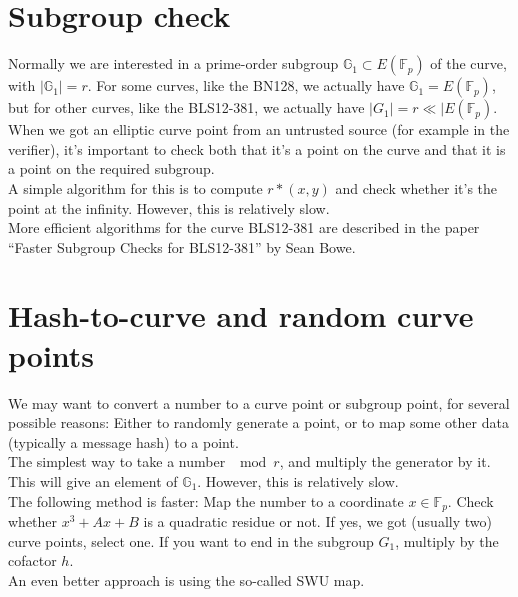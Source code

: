 \documentclass[12pt,draft,a4paper,openany,oneside]{amsbook}
\def\F{\mathbb{F}}
\def\G{\mathbb{G}}
\theoremstyle{plain}
\theoremstyle{definition}
\begin{document}

\section{Subgroup check}

Normally we are interested in a prime-order subgroup $\G_1 \subset E(\F_p)$
of the curve, with $|\G_1|=r$. For some curves, like the BN128, we actually
have $\G_1 = E(\F_p)$, but for other curves, like the BLS12-381, we actually
have $|G_1|=r\ll |E(\F_p)$. When we got an elliptic curve point from an
untrusted source (for example in the verifier), it's important to check both
that it's a point on the curve and that it is a point on the required subgroup.\\

A simple algorithm for this is to compute $r*(x,y)$ and check whether it's
the point at the infinity. However, this is relatively slow.\\

More efficient algorithms for the curve BLS12-381 are described in the paper
``Faster Subgroup Checks for BLS12-381'' by Sean Bowe.


\section{Hash-to-curve and random curve points}

We may want to convert a number to a curve point or subgroup point, for several 
possible reasons: Either to randomly generate a point, or to map some other
data (typically a message hash) to a point.\\

The simplest way to take a number $\mod r$, and multiply the generator by it.
This will give an element of $\G_1$. However, this is relatively slow.\\

The following method is faster: Map the number to a coordinate $x\in\F_p$. Check
whether $x^3+Ax+B$ is a quadratic residue or not. If yes, we got (usually two)
curve points, select one. If you want to end in the subgroup $G_1$, multiply by
the cofactor $h$.\\

An even better approach is using the so-called SWU map.
\end{document}

